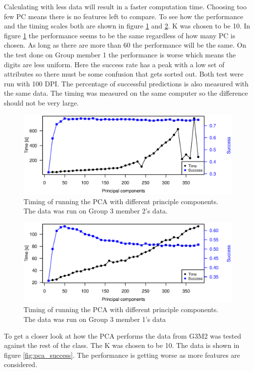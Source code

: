 Calculating with less data will result in a faster computation time.
Choosing too few PC means there is no features left to compare.
To see how the performance and the timing scales both are shown in figure \ref{fig:pca_timing_lukas} and \ref{fig:pca_timing_nikolaj}. K was chosen to be 10.
In figure \ref{fig:pca_timing_lukas} the performance seems to be the same regardless of how many PC is chosen. As long as there are more than 60 the performance will be the same.
On the test done on Group member 1 the performance is worse which means the digits are less uniform. 
Here the success rate has a peak with a low set of attributes so there must be some confusion that gets sorted out. 
Both test were run with 100 DPI. The percentage of successful predictions is also measured with the same data.
The timing was measured on the same computer so the difference should not be very large. 

\begin{figure}[H]
\centering
\includegraphics[width =0.8 \textwidth]{graphics/pca_timing}
\caption[Timing of PCA]{Timing of running the PCA with different principle components. 
The data was run on Group 3 member 2's data. 
}
\label{fig:pca_timing_lukas}
\end{figure}
\begin{figure}[H]
\centering
\includegraphics[width =0.8 \textwidth]{graphics/pca_timing_nikolaj}
\caption[Timing of PCA]{Timing of running the PCA with different principle components. 
The data was run on Group 3 member 1's data}
\label{fig:pca_timing_nikolaj}
\end{figure}

To get a closer look at how the PCA performs the data from G3M2 was tested against the rest of the class. 
The K was chosen to be 10. 
The data is shown in figure \ref{fig:pca_success}.
The performance is getting worse as more features are considered.

